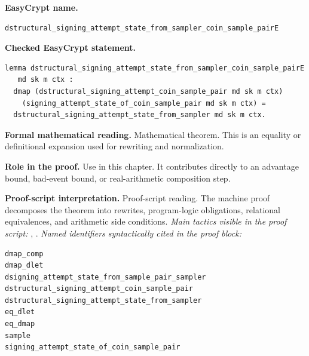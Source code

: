 \begin{formaltheorem}
\noindent\textbf{EasyCrypt name.}
\begin{lstlisting}[language=EasyCrypt,basicstyle=\ttfamily\scriptsize]
dstructural_signing_attempt_state_from_sampler_coin_sample_pairE
\end{lstlisting}
\noindent\textbf{Checked EasyCrypt statement.}
\begin{lstlisting}[language=EasyCrypt,basicstyle=\ttfamily\scriptsize]
lemma dstructural_signing_attempt_state_from_sampler_coin_sample_pairE
   md sk m ctx :
  dmap (dstructural_signing_attempt_coin_sample_pair md sk m ctx)
    (signing_attempt_state_of_coin_sample_pair md sk m ctx) =
  dstructural_signing_attempt_state_from_sampler md sk m ctx.
\end{lstlisting}
\noindent\textbf{Formal mathematical reading.}
Mathematical theorem. This is an equality or definitional expansion used for rewriting and normalization.

\noindent\textbf{Role in the proof.}
Use in this chapter. It contributes directly to an advantage bound, bad-event bound, or real-arithmetic composition step.

\noindent\textbf{Proof-script interpretation.}
Proof-script reading. The machine proof decomposes the theorem into rewrites, program-logic obligations, relational equivalences, and arithmetic side conditions.
\emph{Main tactics visible in the proof script:} , .
\emph{Named identifiers syntactically cited in the proof block:}
\begin{lstlisting}[language=EasyCrypt,basicstyle=\ttfamily\scriptsize]
dmap_comp
dmap_dlet
dsigning_attempt_state_from_sample_pair_sampler
dstructural_signing_attempt_coin_sample_pair
dstructural_signing_attempt_state_from_sampler
eq_dlet
eq_dmap
sample
signing_attempt_state_of_coin_sample_pair
\end{lstlisting}

\end{formaltheorem}

